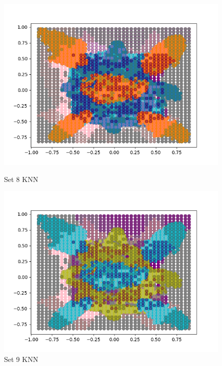 \documentclass{article}
\begin{document}
\begin{figure}[H]
	\centering
	\begin{minipage}{.33\textwidth}
			\centering
			\includegraphics[width=1\linewidth]{../set8KNNdecisions.png}
			\caption{Set 8 KNN}
	\end{minipage}\hfill
        \centering
	\begin{minipage}{.33\textwidth}
			\centering
			\includegraphics[width=1\linewidth]{../set9KNNdecisions.png}
			\caption{Set 9 KNN}
	\end{minipage}\hfill
        \centering
	\begin{minipage}{.33\textwidth}
			\centering

\end{minipage}
\end{figure}
\end{document}
